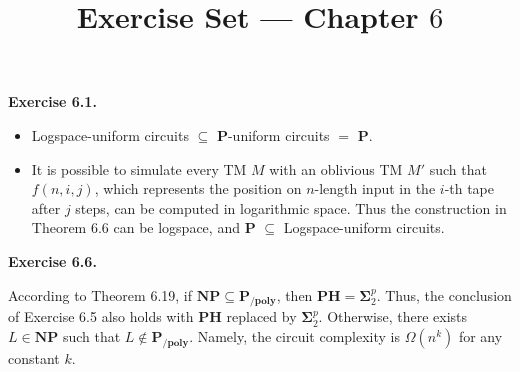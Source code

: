 \documentclass[a4paper]{article}
\title{Exercise Set --- Chapter $6$}
\date{}
\newenvironment{exercise}[1]{
	\par
	\noindent\textbf{Exercise #1.}\quad
}{
	\par
	\bigskip
}
\begin{document}
\maketitle

\begin{exercise}{6.1}
    \begin{itemize}
    \item Logspace-uniform circuits $\subseteq$ $\mathbf{P}$-uniform circuits $=$ $\mathbf{P}$.
    \item It is possible to simulate every TM $M$ with an oblivious TM $M'$ such that $f(n,i,j)$, which represents the position
        on $n$-length input in the $i$-th tape after $j$ steps, can be computed in logarithmic space.
            Thus the construction in Theorem 6.6 can be logspace, and $\mathbf{P}$ $\subseteq$ Logspace-uniform circuits.
    \end{itemize}
\end{exercise}

\begin{exercise}{6.6}
    According to Theorem 6.19, if $\textbf{NP} \subseteq \textbf{P}_{\textbf{/poly}}$, then $\textbf{PH} = \mathbf{\Sigma}_2^p$. Thus, the conclusion of Exercise 6.5 also holds with $\mathbf{PH}$ replaced by $\mathbf{\Sigma}_2^p$. Otherwise, there exists $L \in \textbf{NP}$ such that $L \not\in \textbf{P}_{\textbf{/poly}}$. Namely, the circuit complexity is $\Omega(n^k)$ for any constant $k$.
\end{exercise}
\end{document}
